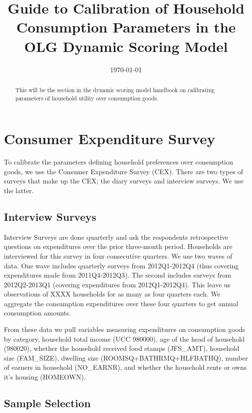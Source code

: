 \documentclass[article,11pt,letterpaper,fleqn]{article}
\title{Guide to Calibration of Household Consumption Parameters in the OLG Dynamic Scoring Model}
\date{\today}
\theoremstyle{definition}
\numberwithin{equation}{section}
\begin{document}

\maketitle



\begin{abstract}
This will be the section in the dynamic scoring model handbook on calibrating parameters of household utility over consumption goods.
\end{abstract}

\section{Consumer Expenditure Survey}

To calibrate the parameters defining household preferences over consumption goods, we use the Consumer Expenditure Survey (CEX).  There are two types of surveys that make up the CEX; the diary surveys and interview surveys.  We use the latter.  

\subsection{Interview Surveys}

Interview Surveys are done quarterly and ask the respondents retrospective questions on expenditures over the prior three-month period.  Households are interviewed for this survey in four consecutive quarters.  We use two waves of data.  One wave includes quarterly surveys from 2012Q1-2012Q4 (thus covering expenditures made from 2011Q4-2012Q3). The second includes surveys from 2012Q2-2013Q1 (covering expenditures from 2012Q1-2012Q4).  This leave us observations of XXXX households for as many as four quarters each.  We aggregate the consumption expenditures over these four quarters to get annual consumption amounts.

From these data we pull variables measuring expenditures on consumption goods by category, household total income (UCC 980000), age of the head of household (980020), whether the household received food stamps (JFS\_AMT), household size (FAM\_SIZE), dwelling size (ROOMSQ+BATHRMQ+HLFBATHQ), number of earners in household (NO\_EARNR), and whether the household rents or owns it's housing (HOMEOWN).

\subsection{Sample Selection}
\end{document}
